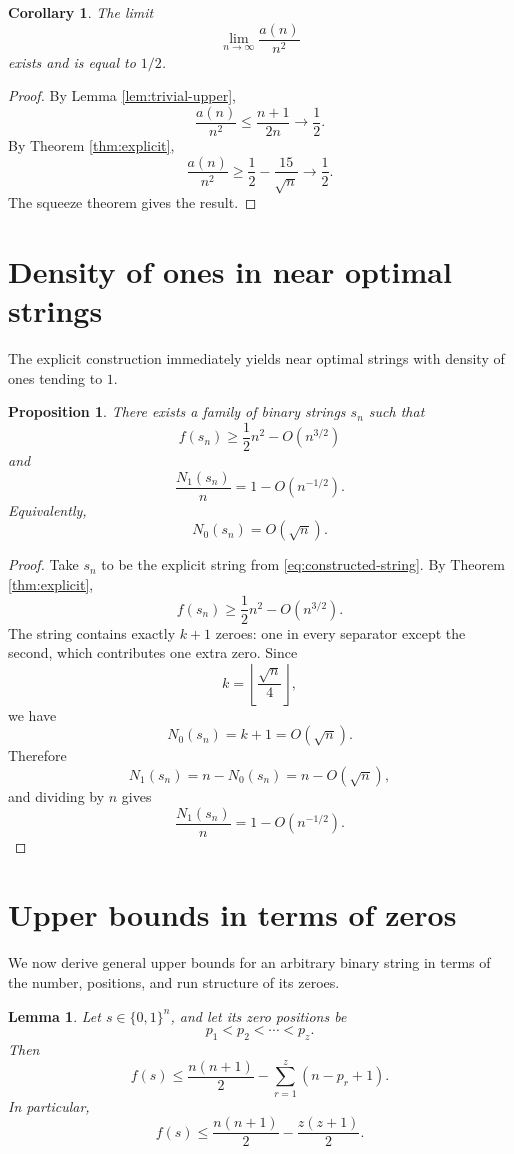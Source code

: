 \documentclass[11pt]{article}
\newtheorem{proposition}[theorem]{Proposition}
\newtheorem{lemma}[theorem]{Lemma}
\newtheorem{corollary}[theorem]{Corollary}
\newcommand{\ones}{N_1}
\newcommand{\zeros}{N_0}
\begin{document}
\begin{corollary}
The limit
\[
\lim_{n\to\infty}\frac{a(n)}{n^2}
\]
exists and is equal to $1/2$.
\end{corollary}

\begin{proof}
By Lemma \ref{lem:trivial-upper},
\[
\frac{a(n)}{n^2}\le \frac{n+1}{2n}\to \frac12.
\]
By Theorem \ref{thm:explicit},
\[
\frac{a(n)}{n^2}\ge \frac12-\frac{15}{\sqrt n}\to \frac12.
\]
The squeeze theorem gives the result.
\end{proof}

\section{Density of ones in near optimal strings}

The explicit construction immediately yields near optimal strings with density of ones tending to $1$.

\begin{proposition}\label{prop:near-optimal-density}
There exists a family of binary strings $s_n$ such that
\[
f(s_n)\ge \frac12 n^2-O(n^{3/2})
\]
and
\[
\frac{\ones(s_n)}{n}=1-O(n^{-1/2}).
\]
Equivalently,
\[
\zeros(s_n)=O(\sqrt n).
\]
\end{proposition}

\begin{proof}
Take $s_n$ to be the explicit string from \eqref{eq:constructed-string}.  By Theorem \ref{thm:explicit},
\[
f(s_n)\ge \frac12 n^2-O(n^{3/2}).
\]
The string contains exactly $k+1$ zeroes: one in every separator except the second, which contributes one extra zero.  Since
\[
k=\left\lfloor \frac{\sqrt n}{4}\right\rfloor,
\]
we have
\[
\zeros(s_n)=k+1=O(\sqrt n).
\]
Therefore
\[
\ones(s_n)=n-\zeros(s_n)=n-O(\sqrt n),
\]
and dividing by $n$ gives
\[
\frac{\ones(s_n)}{n}=1-O(n^{-1/2}).
\]
\end{proof}

\section{Upper bounds in terms of zeros}

We now derive general upper bounds for an arbitrary binary string in terms of the number, positions, and run structure of its zeroes.


\begin{lemma}\label{lem:zero-position}
Let $s\in\{0,1\}^n$, and let its zero positions be
\[
p_1<p_2<\cdots<p_z.
\]
Then
\[
f(s)\le \frac{n(n+1)}{2}-\sum_{r=1}^z (n-p_r+1).
\]
In particular,
\[
f(s)\le \frac{n(n+1)}{2}-\frac{z(z+1)}{2}.
\]
\end{lemma}
\end{document}
